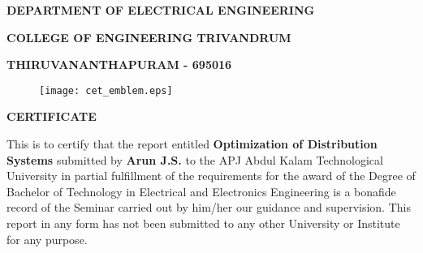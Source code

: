 \documentclass[a4paper,12pt,oneside]{report}%
\begin{document}
\vspace*{-0.3cm}
\begin{center}  {\large \bf  DEPARTMENT OF ELECTRICAL ENGINEERING}\end{center}
\begin{center}  {\large \bf COLLEGE OF ENGINEERING TRIVANDRUM}\end{center}
\begin{center}  {\large \bf THIRUVANANTHAPURAM - 695016}\vspace{0.1cm}\end{center}

\begin{figure}[hbt]
\centering
\centerline{\texttt{[image: cet\_emblem.eps]}}
\end{figure}

\begin{center}  {\large \bf  {CERTIFICATE}}\vspace{.1cm}\end{center}

This  is  to  certify  that  the report entitled {\large \bf  {Optimization of Distribution Systems}} submitted  by \textbf{Arun J.S.} to the APJ Abdul Kalam Technological University in partial fulfillment of the requirements  for  the  award  of  the  Degree  of  Bachelor  of  Technology  in Electrical and Electronics Engineering is a bonafide record of the Seminar carried out by him/her our guidance  and  supervision. This  report in  any  form    has  not  been  submitted  to  any
other University or Institute for any purpose.
\end{document}
